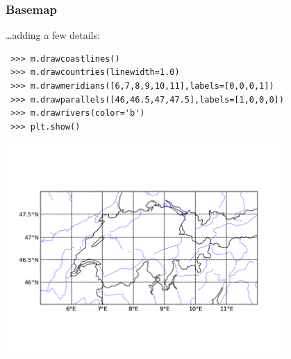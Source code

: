 \begin{frame}[fragile]
\frametitle{Basemap}
\ldots adding a few details:
\begin{myColorBox}{1.0}{}
\begin{verbatim}
 >>> m.drawcoastlines()
 >>> m.drawcountries(linewidth=1.0)
 >>> m.drawmeridians([6,7,8,9,10,11],labels=[0,0,0,1])
 >>> m.drawparallels([46,46.5,47,47.5],labels=[1,0,0,0])
 >>> m.drawrivers(color='b')
 >>> plt.show()
\end{verbatim}
\end{myColorBox}
\pause
\begin{center}
      \includegraphics[width=0.8\textwidth]{pix/basemap_example_2}
\end{center}
\end{frame}
